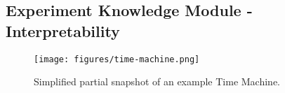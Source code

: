 
\subsection{Experiment Knowledge Module - Interpretability}
\label{subsec:interface}

\begin{figure}
    \centering
    \texttt{[image: figures/time-machine.png]}
    \caption{Simplified partial snapshot of an example Time Machine.}
    \label{fig:time-machine}
\end{figure}



